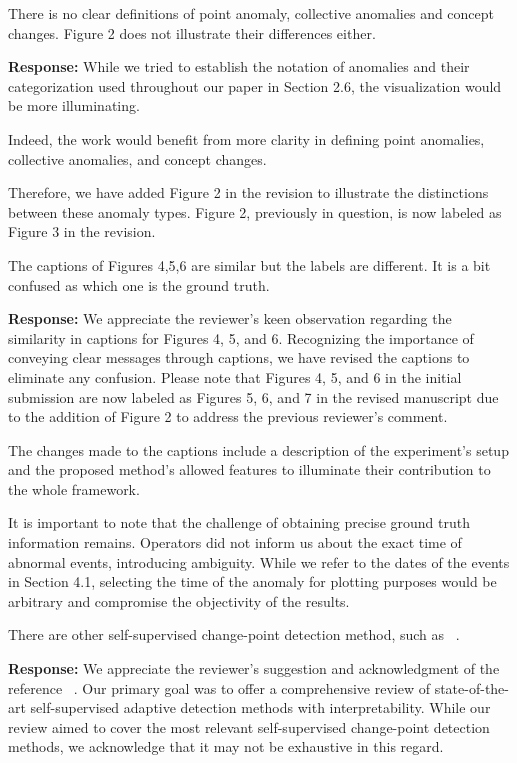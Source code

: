 \documentclass{article}
\makeatletter
\newenvironment{comment}{
\begin{sloppypar}\slshape
\vspace{5 mm}
\color{blue}
 \@beginparpenalty\@M
  \begin{list}{}{\setlength{\topsep}{0ex}%
  \setlength{\leftmargin}{\rightmargin}}\item[]
 \@beginparpenalty\@endparpenalty
}
{\end{list}
\end{sloppypar}
}
\makeatother
\begin{document}
\begin{enumerate}

  \item
        \begin{comment}
        There is no clear definitions of point anomaly, collective anomalies and concept changes. Figure 2 does not illustrate their differences either.
        \end{comment}
        {\bf Response:}
        While we tried to establish the notation of anomalies and their categorization used throughout our paper in Section 2.6, the visualization would be more illuminating.

        Indeed, the work would benefit from more clarity in defining point anomalies, collective anomalies, and concept changes.

        Therefore, we have added Figure 2 in the revision to illustrate the distinctions between these anomaly types. Figure 2, previously in question, is now labeled as Figure 3 in the revision.

  \item
        \begin{comment}
        The captions of Figures 4,5,6 are similar but the labels are different. It is a bit confused as which one is the ground truth.
        \end{comment}
        {\bf Response:}
        We appreciate the reviewer's keen observation regarding the similarity in captions for Figures 4, 5, and 6. Recognizing the importance of conveying clear messages through captions, we have revised the captions to eliminate any confusion. Please note that Figures 4, 5, and 6 in the initial submission are now labeled as Figures 5, 6, and 7 in the revised manuscript due to the addition of Figure 2 to address the previous reviewer's comment.

        The changes made to the captions include a description of the experiment's setup and the proposed method's allowed features to illuminate their contribution to the whole framework.

        It is important to note that the challenge of obtaining precise ground truth information remains. Operators did not inform us about the exact time of abnormal events, introducing ambiguity. While we refer to the dates of the events in Section 4.1, selecting the time of the anomaly for plotting purposes would be arbitrary and compromise the objectivity of the results.

  \item
        \begin{comment}
        There are other self-supervised change-point detection method, such as ~\cite{Deldari2021}.
        \end{comment}
        {\bf Response:}
        We appreciate the reviewer's suggestion and acknowledgment of the reference ~\cite{Deldari2021}. Our primary goal was to offer a comprehensive review of state-of-the-art self-supervised adaptive detection methods with interpretability. While our review aimed to cover the most relevant self-supervised change-point detection methods, we acknowledge that it may not be exhaustive in this regard.


\end{enumerate}
\end{document}
